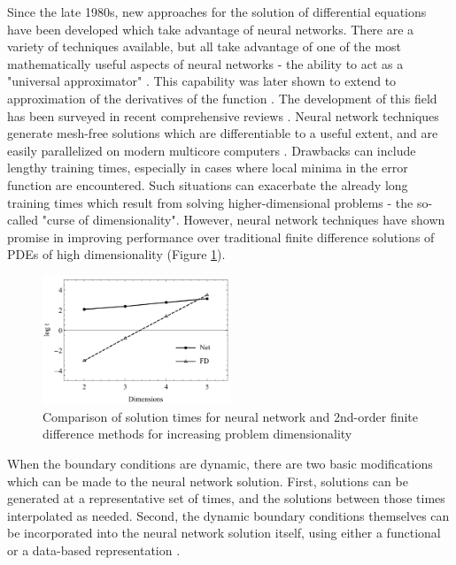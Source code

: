 \documentclass{article}
\begin{document}
Since the late 1980s, new approaches for the solution of differential equations have been developed which take advantage of neural networks. There are a variety of techniques available, but all take advantage of one of the most mathematically useful aspects of neural networks - the ability to act as a "universal approximator" \cite{Hornik1989}. This capability was later shown to extend to approximation of the derivatives of the function \cite{Hornik1990}. The development of this field has been surveyed in recent comprehensive reviews \cite{Yadav2015,Chakraverty2017}. Neural network techniques generate mesh-free solutions which are differentiable to a useful extent, and are easily parallelized on modern multicore computers \cite{Schuessler2011}. Drawbacks can include lengthy training times, especially in cases where local minima in the error function are encountered. Such situations can exacerbate the already long training times which result from solving higher-dimensional problems - the so-called "curse of dimensionality". However, neural network techniques have shown promise in improving performance over traditional finite difference solutions of PDEs of high dimensionality (Figure \ref{fig:Avrutskiy_2017}).

\begin{figure}
  \centering
  \includegraphics[width=0.5\textwidth]{Avrutskiy_2017.png}
  \caption{Comparison of solution times for neural network and 2nd-order finite difference methods for increasing problem dimensionality \cite{Avrutskiy2017}}
  \label{fig:Avrutskiy_2017}
\end{figure}

When the boundary conditions are dynamic, there are two basic modifications which can be made to the neural network solution. First, solutions can be generated at a representative set of times, and the solutions between those times interpolated as needed. Second, the dynamic boundary conditions themselves can be incorporated into the neural network solution itself, using either a functional or a data-based representation \cite{Lagaris1998}.
\end{document}
